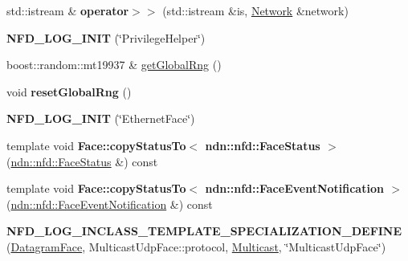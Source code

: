 \begin{DoxyCompactItemize}
\item 
std\+::istream \& {\bfseries operator$>$$>$} (std\+::istream \&is, \hyperlink{classnfd_1_1Network}{Network} \&network)\hypertarget{namespacenfd_ae11bda84a773b691432feac0db7b0db4}{}\label{namespacenfd_ae11bda84a773b691432feac0db7b0db4}

\item 
{\bfseries N\+F\+D\+\_\+\+L\+O\+G\+\_\+\+I\+N\+IT} (\char`\"{}Privilege\+Helper\char`\"{})\hypertarget{namespacenfd_a8057ad665d5978c63d25cd3c64122871}{}\label{namespacenfd_a8057ad665d5978c63d25cd3c64122871}

\item 
boost\+::random\+::mt19937 \& \hyperlink{namespacenfd_aa235b1fa55ca219a7ccd3f88412f8df2}{get\+Global\+Rng} ()
\item 
void {\bfseries reset\+Global\+Rng} ()\hypertarget{namespacenfd_ab187bd350872c2dfbd8a077364e7b448}{}\label{namespacenfd_ab187bd350872c2dfbd8a077364e7b448}

\item 
{\bfseries N\+F\+D\+\_\+\+L\+O\+G\+\_\+\+I\+N\+IT} (\char`\"{}Ethernet\+Face\char`\"{})\hypertarget{namespacenfd_aecc58c38de3bf2ba3811f6415f82f041}{}\label{namespacenfd_aecc58c38de3bf2ba3811f6415f82f041}

\item 
template void {\bfseries Face\+::copy\+Status\+To$<$ ndn\+::nfd\+::\+Face\+Status $>$} (\hyperlink{classndn_1_1nfd_1_1FaceStatus}{ndn\+::nfd\+::\+Face\+Status} \&) const\hypertarget{namespacenfd_ac90a10408aa78152319e684162d4db98}{}\label{namespacenfd_ac90a10408aa78152319e684162d4db98}

\item 
template void {\bfseries Face\+::copy\+Status\+To$<$ ndn\+::nfd\+::\+Face\+Event\+Notification $>$} (\hyperlink{classndn_1_1nfd_1_1FaceEventNotification}{ndn\+::nfd\+::\+Face\+Event\+Notification} \&) const\hypertarget{namespacenfd_a78d3808aaef0f53063aad026ccab2a1c}{}\label{namespacenfd_a78d3808aaef0f53063aad026ccab2a1c}

\item 
{\bfseries N\+F\+D\+\_\+\+L\+O\+G\+\_\+\+I\+N\+C\+L\+A\+S\+S\+\_\+T\+E\+M\+P\+L\+A\+T\+E\+\_\+\+S\+P\+E\+C\+I\+A\+L\+I\+Z\+A\+T\+I\+O\+N\+\_\+\+D\+E\+F\+I\+NE} (\hyperlink{classnfd_1_1DatagramFace}{Datagram\+Face}, Multicast\+Udp\+Face\+::protocol, \hyperlink{structnfd_1_1Multicast}{Multicast}, \char`\"{}Multicast\+Udp\+Face\char`\"{})\hypertarget{namespacenfd_a380968b4a35cb7f3ca566cddc86bca4d}{}\label{namespacenfd_a380968b4a35cb7f3ca566cddc86bca4d}


\end{DoxyCompactItemize}
